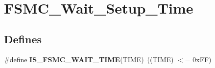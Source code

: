 \hypertarget{group__FSMC__Wait__Setup__Time}{
\section{FSMC\_\-Wait\_\-Setup\_\-Time}
\label{group__FSMC__Wait__Setup__Time}
}
\subsection*{Defines}
\begin{DoxyCompactItemize}
\item 
\hypertarget{group__FSMC__Wait__Setup__Time_ga5c0efc48afb916ceff32868940f81613}{
\#define {\bfseries IS\_\-FSMC\_\-WAIT\_\-TIME}(TIME)~((TIME) $<$= 0xFF)}
\label{group__FSMC__Wait__Setup__Time_ga5c0efc48afb916ceff32868940f81613}

\end{DoxyCompactItemize}
